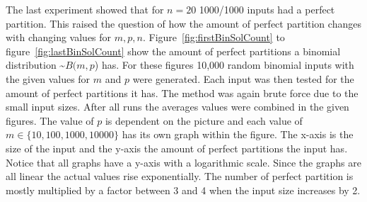 The last experiment showed that for $n=20$ 1000/1000 inputs had a perfect partition. This raised the question of how the amount of perfect partition changes with changing values for $m, p, n$.
Figure~\ref{fig:firstBinSolCount} to figure~\ref{fig:lastBinSolCount} show the amount of perfect partitions a binomial distribution \textasciitilde$B(m,p$) has.
For these figures 10,000 random binomial inputs with the given values for $m$ and $p$ were generated.
Each input was then tested for the amount of perfect partitions it has.
The method was again brute force due to the small input sizes.
After all runs the averages values were combined in the given figures.
The value of $p$ is dependent on the picture and each value of $m \in \{10,100,1000,10000\}$ has its own graph within the figure.
The x-axis is the size of the input and the y-axis the amount of perfect partitions the input has.
Notice that all graphs have a y-axis with a logarithmic scale.
Since the graphs are all linear the actual values rise exponentially.
The number of perfect partition is mostly multiplied by a factor between 3 and 4 when the input size increases by 2.

